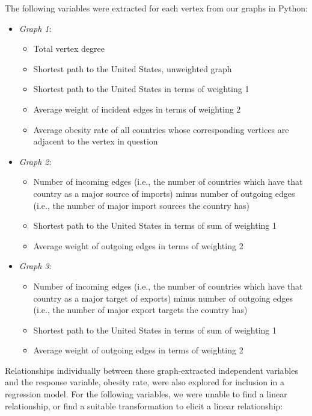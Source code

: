 \documentclass[oneside,12pt]{report}
\begin{document}
\noindent
The following variables were extracted for each vertex from our graphs in Python:
\begin{itemize}
\item \emph{Graph 1}:
	\begin{itemize}
	\item Total vertex degree
	\item Shortest path to the United States, unweighted graph
	\item Shortest path to the United States in terms of weighting 1
	\item Average weight of incident edges in terms of weighting 2
	\item Average obesity rate of all countries whose corresponding vertices are adjacent to the vertex in question
	\end{itemize}
\item \emph{Graph 2}:
	\begin{itemize}
	\item Number of incoming edges (i.e., the number of countries which have that country as a major source of imports) minus number of outgoing edges (i.e., the number of major import sources the country has)
	\item Shortest path to the United States in terms of sum of weighting 1
	\item Average weight of outgoing edges in terms of weighting 2
	\end{itemize}
\item \emph{Graph 3}:
	\begin{itemize}
	\item Number of incoming edges (i.e., the number of countries which have that country as a major target of exports) minus number of outgoing edges (i.e., the number of major export targets the country has)
	\item Shortest path to the United States in terms of sum of weighting 1
	\item Average weight of outgoing edges in terms of weighting 2
	\end{itemize}
\end{itemize}


\noindent Relationships individually between these graph-extracted independent variables and the response variable, obesity rate, were also explored for inclusion in a regression model. For the following variables, we were unable to find a linear relationship, or find a suitable transformation to elicit a linear relationship:
\end{document}
